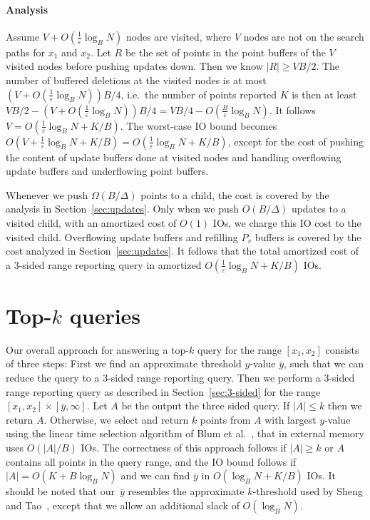 \documentclass[11pt]{article}
\begin{document}
\paragraph*{Analysis}

Assume $V+O(\frac{1}{\varepsilon}\log_B N)$ nodes are visited, where
$V$ nodes are not on the search paths for $x_1$ and $x_2$. Let $R$ be
the set of points in the point buffers of the $V$ visited nodes before
pushing updates down. Then we know $|R|\geq VB/2$. The number of
buffered deletions at the visited nodes is at most
$(V+O(\frac{1}{\varepsilon}\log_B N))B/4$, i.e.\ the number of points
reported $K$ is then at least $VB/2-(V+O(\frac{1}{\varepsilon}\log_B
N))B/4=VB/4-O(\frac{B}{\varepsilon}\log_B N)$.  It follows
$V=O(\frac{1}{\varepsilon}\log_B N+K/B)$.  The worst-case IO bound
becomes $O(V+\frac{1}{\varepsilon}\log_B
N+K/B)=O(\frac{1}{\varepsilon}\log_B N+K/B)$, except for the cost of
pushing the content of update buffers done at visited nodes and
handling overflowing update buffers and underflowing point buffers.

Whenever we push $\Omega(B/\Delta)$ points to a child, the cost is
covered by the analysis in Section~\ref{sec:updates}. Only when we
push $O(B/\Delta)$ updates to a visited child, with an amortized cost
of $O(1)$ IOs, we charge this IO cost to the visited child.
Overflowing update buffers and refilling $P_v$ buffers is covered by
the cost analyzed in Section~\ref{sec:updates}. It follows that the
total amortized cost of a 3-sided range reporting query in amortized
$O(\frac{1}{\varepsilon}\log_B N+ K/B)$ IOs.

\section{Top-$k$ queries}
\label{sec:top-k}

Our overall approach for answering a top-$k$ query for the range
$[x_1,x_2]$ consists of three steps: First we find an approximate
threshold $y$-value $\bar{y}$, such that we can reduce the query to a
3-sided range reporting query. Then we perform a 3-sided range
reporting query as described in Section~\ref{sec:3-sided} for the
range $[x_1,x_2]\times[\bar{y},\infty]$. Let $A$ be the output the
three sided query.  If $|A|\leq k$ then we return $A$. Otherwise, we
select and return $k$ points from $A$ with largest $y$-value using the
linear time selection algorithm of Blum et al.~\cite{bfprt73}, that in
external memory uses $O(|A|/B)$ IOs.  The correctness of this approach
follows if $|A|\geq k$ or $A$ contains all points in the query range,
and the IO bound follows if $|A|=O(K+B\log_B N)$ and we can find
$\bar{y}$ in $O(\log_B N+ K/B)$ IOs.  It should be noted that
our~$\bar{y}$ resembles the approximate $k$-threshold used by Sheng
and Tao~\cite{pods12st}, except that we allow an additional slack of
$O(\log_B N)$.
\end{document}
